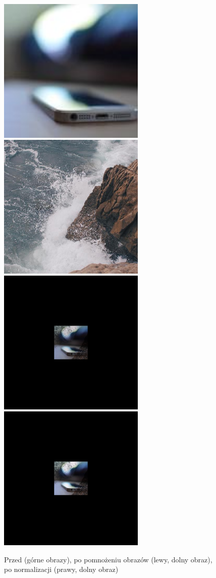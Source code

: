 \documentclass[a4paper,12pt]{book}
\begin{document}
\begin{figure}[H]
\end{figure}
\begin{figure}[H]
	\caption{Przed (górne obrazy), po pomnożeniu obrazów (lewy, dolny obraz), po normalizacji (prawy, dolny obraz)}
	\includegraphics[width=7cm, height=7cm]{phone-unmodified.jpg}
	\includegraphics[width=7cm, height=7cm]{sea-unmodified.jpg}
	\includegraphics[width=7cm, height=7cm]{3-2/multiply-color-images-phone-sea.png}
	\includegraphics[width=7cm, height=7cm]{3-2/multiply-color-images-phone-sea-norm.png}
\end{figure}
\end{document}

